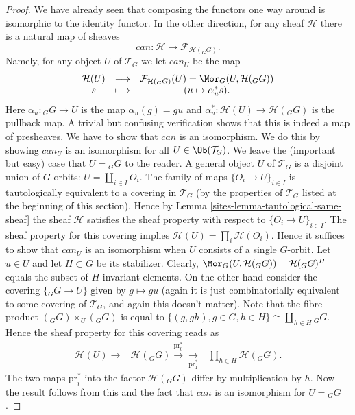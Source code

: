 \begin{proof}

We have already seen that composing the functors one way around
is isomorphic to the identity functor.
In the other direction, for any sheaf $\mathcal{H}$ there is a natural
map of sheaves
$$
can :
\mathcal{H}
\longrightarrow
\mathcal{F}_{\mathcal{H}({}_GG)}.
$$
Namely, for any object $U$ of $\mathcal{T}_G$ we let $can_U$
be the map
$$
\begin{matrix}
\mathcal{H}(U)
&
\longrightarrow
&
\mathcal{F}_{\mathcal{H}({}_GG)}(U)
=
\Mor_G(U, \mathcal{H}({}_GG))
\\
s
&
\longmapsto
&
(u \mapsto \alpha_u^*s).
\end{matrix}
$$
Here $\alpha_u : {}_GG \to U$ is the map
$\alpha_u(g) = gu$ and $\alpha_u^* : \mathcal{H}(U)
\to \mathcal{H}({}_GG)$ is the pullback map. A trivial
but confusing verification shows that this is indeed a map
of presheaves. We have to show that $can$ is an isomorphism.
We do this by showing $can_U$ is an isomorphism for all
$U \in \Ob(\mathcal{T}_G)$. We leave the (important but
easy) case that $U = {}_GG$ to the reader.
A general object $U$ of $\mathcal{T}_G$ is a disjoint union of
$G$-orbits: $U = \coprod_{i\in I} O_i$. The family of maps
$\{O_i \to U\}_{i \in I}$ is tautologically equivalent
to a covering in $\mathcal{T}_G$ (by the properties of $\mathcal{T}_G$
listed at the beginning of this section). Hence by Lemma
\ref{sites-lemma-tautological-same-sheaf} the sheaf $\mathcal{H}$
satisfies the sheaf property with respect to
$\{O_i \to U\}_{i \in I}$. The sheaf property for this covering
implies $\mathcal{H}(U) = \prod_i \mathcal{H}(O_i)$.
Hence it suffices to show that $can_U$ is an
isomorphism when $U$ consists of a single $G$-orbit. Let $u \in U$
and let $H \subset G$ be its stabilizer. Clearly,
$\Mor_G(U, \mathcal{H}({}_GG)) = \mathcal{H}({}_GG)^H$
equals the subset of $H$-invariant elements. On the other hand
consider the covering $\{{}_GG \to U\}$ given by $g \mapsto
gu$ (again it is just combinatorially equivalent to some covering
of $\mathcal{T}_G$, and again this doesn't matter).
Note that the fibre product $({}_GG)\times_U ({}_GG)$
is equal to $\{(g, gh), g\in G, h\in H\} \cong \coprod_{h\in H} {}_GG$.
Hence the sheaf property for this covering reads as
$$
\begin{array}{ccc}\mathcal{H}(U) \longrightarrow & \mathcal{H}({}_GG)
\overset{\text{pr}_0^*}{\longrightarrow}\underset{\text{pr}_1^*}{\longrightarrow} & \prod_{h \in H}
\mathcal{H}({}_GG).\end{array}
$$
The two maps $\text{pr}_i^*$ into the factor
$\mathcal{H}({}_GG)$ differ by multiplication by $h$.
Now the result follows from this and the fact that $can$
is an isomorphism for $U = {}_GG$.
\end{proof}

